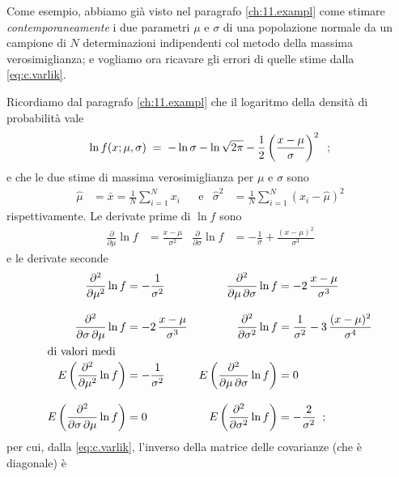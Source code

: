Come esempio, abbiamo gi\`a visto nel paragrafo
\ref{ch:11.exampl} come stimare \emph{contemporaneamente} i
due parametri $\mu$ e $\sigma$ di una popolazione normale da
un campione di $N$ determinazioni indipendenti col metodo
della massima verosimiglianza; e vogliamo ora ricavare gli
errori di quelle stime dalla \eqref{eq:c.varlik}.

Ricordiamo dal paragrafo \ref{ch:11.exampl} che il logaritmo
della densit\`a di probabilit\`a vale
\begin{equation*}
  \ln f ( x; \mu, \sigma ) \; = \; - \ln \sigma - \ln \sqrt{
    2 \pi } - \frac{1}{2} \left( \frac{x - \mu}{ \sigma }
    \right)^2 \;\; ;
\end{equation*}
e che le due stime di massima verosimiglianza per $\mu$ e
$\sigma$ sono
\begin{align*}
  \widehat \mu &= \bar x = \frac{1}{N} \sum_{i=1}^N x_i
   &&\text{e} &
   \widehat \sigma^2 &= \frac{1}{N} \sum_{i=1}^N \left( x_i
     - \widehat \mu \right)^2
\end{align*}
rispettivamente.
Le derivate prime di $\ln f$ sono
\begin{align*}
  \frac{\partial}{\partial \mu} \ln f &= \frac{x -
    \mu}{\sigma^2}
  &
  \frac{\partial}{\partial \sigma} \ln f &= -
    \frac{1}{\sigma} + \frac{( x - \mu )^2}{\sigma^3}
\end{align*}
e le derivate seconde
\begin{align*}
  \frac{\partial^2}{\partial \mu^2} \ln f &= -
    \frac{1}{\sigma^2} &
  \frac{\partial^2}{\partial \mu \, \partial \sigma} \ln f
    &= - 2 \, \frac{x - \mu}{\sigma^3} \\[2ex]
  \frac{\partial^2}{\partial \sigma \, \partial \mu
    } \ln f &= - 2 \, \frac{x - \mu}{\sigma^3} &
  \frac{\partial^2}{\partial \sigma^2} \ln f &=
    \frac{1}{\sigma^2} - 3 \, \frac{( x - \mu )^2}{\sigma^4}
    \\
  \intertext{di valori medi}
  E \left( \frac{\partial^2}{\partial \mu^2} \ln f \right)
    &= - \frac{1}{\sigma^2} &
  E \left( \frac{\partial^2}{\partial \mu \, \partial
    \sigma} \ln f \right) &= 0 \\[2ex]
  E \left( \frac{\partial^2}{\partial \sigma \,
    \partial \mu } \ln f \right) &= 0 &
  E \left( \frac{\partial^2}{\partial \sigma^2} \ln f
    \right) &= - \frac{2}{\sigma^2} \;\; ;
\end{align*}
per cui, dalla \eqref{eq:c.varlik}, l'inverso della matrice
delle covarianze (che \`e diagonale) \`e
